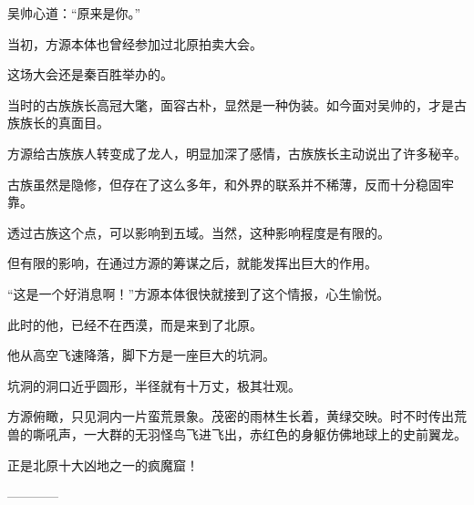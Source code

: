\begin{this_body}
吴帅心道：“原来是你。”

当初，方源本体也曾经参加过北原拍卖大会。

这场大会还是秦百胜举办的。

当时的古族族长高冠大氅，面容古朴，显然是一种伪装。如今面对吴帅的，才是古族族长的真面目。

方源给古族族人转变成了龙人，明显加深了感情，古族族长主动说出了许多秘辛。

古族虽然是隐修，但存在了这么多年，和外界的联系并不稀薄，反而十分稳固牢靠。

透过古族这个点，可以影响到五域。当然，这种影响程度是有限的。

但有限的影响，在通过方源的筹谋之后，就能发挥出巨大的作用。

“这是一个好消息啊！”方源本体很快就接到了这个情报，心生愉悦。

此时的他，已经不在西漠，而是来到了北原。

他从高空飞速降落，脚下方是一座巨大的坑洞。

坑洞的洞口近乎圆形，半径就有十万丈，极其壮观。

方源俯瞰，只见洞内一片蛮荒景象。茂密的雨林生长着，黄绿交映。时不时传出荒兽的嘶吼声，一大群的无羽怪鸟飞进飞出，赤红色的身躯仿佛地球上的史前翼龙。

正是北原十大凶地之一的疯魔窟！

------------

\end{this_body}

